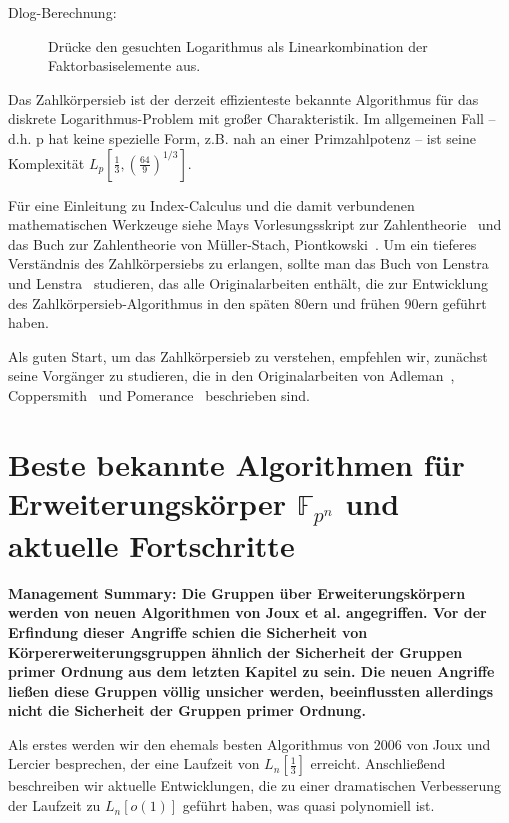 \begin{refsegment}
\begin{description}
\item[Dlog-Berechnung:] Drücke den gesuchten Logarithmus als Linearkombination der Faktorbasiselemente aus.
\end{description}

Das Zahlkörpersieb ist der derzeit effizienteste bekannte Algorithmus für das diskrete Logarithmus-Problem mit großer Charakteristik. Im allgemeinen Fall -- d.h. p hat keine spezielle Form, z.B. nah an einer Primzahlpotenz -- ist seine Komplexität $L_p[\frac 1
3,\left(\frac{64}{9}\right)^{1/3}]$.

Für eine Einleitung zu Index-Calculus und die damit verbundenen mathematischen Werkzeuge siehe Mays Vorlesungsskript zur Zahlentheorie~\cite{May2013} und das Buch zur Zahlentheorie von M\"uller-Stach, Piontkowski~\cite{MSP2011}. Um ein tieferes Verständnis des Zahlkörpersiebs zu erlangen, sollte man das Buch von Lenstra und Lenstra~\cite{NFS1993} studieren, das alle Originalarbeiten enthält, die zur Entwicklung des Zahlkörpersieb-Algorithmus in den späten 80ern und frühen 90ern geführt haben.

Als guten Start, um das Zahlkörpersieb zu verstehen, empfehlen wir, zunächst seine Vorgänger zu studieren, die in den Originalarbeiten von Adleman~\cite{Adleman1979}, Coppersmith~\cite{CoppersmithOS1986} und Pomerance~\cite{Pomerance1984,Pomerance1996} beschrieben sind.


\newpage
\section{\texorpdfstring{Beste bekannte Algorithmen für Erweiterungskörper $\mathbb{F}_{p^n}$ und aktuelle Fortschritte}
                        {Beste bekannte Algorithmen für Erweiterungskörper Fpn und aktuelle Fortschritte}}
\label{ffs}
{\bf Management Summary: Die Gruppen über Erweiterungskörpern werden von neuen Algorithmen von Joux et al. angegriffen. Vor der Erfindung dieser Angriffe schien die Sicherheit von Körpererweiterungsgruppen ähnlich der Sicherheit der Gruppen primer Ordnung aus dem letzten Kapitel zu sein. Die neuen Angriffe ließen diese Gruppen völlig unsicher werden, beeinflussten allerdings nicht die Sicherheit der Gruppen primer Ordnung.\\[0.1cm]}

Als erstes werden wir den ehemals besten Algorithmus von 2006 von Joux und Lercier besprechen, der eine Laufzeit von $L_n[\frac 1 3]$ erreicht. Anschließend beschreiben wir aktuelle Entwicklungen, die zu einer dramatischen Verbesserung der Laufzeit zu $L_n[o(1)]$ geführt haben, was quasi polynomiell ist.



\end{refsegment}
